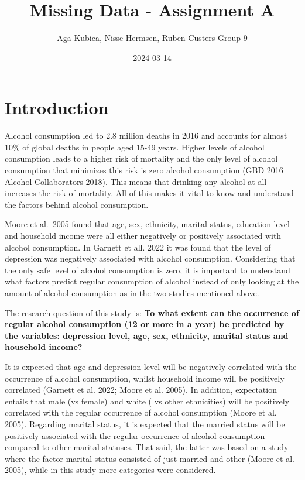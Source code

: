 \documentclass[
]{article}
\title{Missing Data - Assignment A}
\author{Aga Kubica, Nisse Hermsen, Ruben Custers \textbar{} Group 9}
\date{2024-03-14}
\begin{document}
\maketitle

{
\setcounter{tocdepth}{2}
\tableofcontents
}
\newpage

\hypertarget{introduction}{%
\section{Introduction}\label{introduction}}

Alcohol consumption led to 2.8 million deaths in 2016 and accounts for almost 10\% of global deaths in people aged 15-49 years. Higher levels of alcohol consumption leads to a higher risk of mortality and the only level of alcohol consumption that minimizes this risk is zero alcohol consumption (GBD 2016 Alcohol Collaborators 2018). This means that drinking any alcohol at all increases the risk of mortality. All of this makes it vital to know and understand the factors behind alcohol consumption.

Moore et al.~2005 found that age, sex, ethnicity, marital status, education level and household income were all either negatively or positively associated with alcohol consumption. In Garnett et all. 2022 it was found that the level of depression was negatively associated with alcohol consumption. Considering that the only safe level of alcohol consumption is zero, it is important to understand what factors predict regular consumption of alcohol instead of only looking at the amount of alcohol consumption as in the two studies mentioned above.

The research question of this study is: \textbf{To what extent can the occurrence of regular alcohol consumption (12 or more in a year) be predicted by the variables: depression level, age, sex, ethnicity, marital status and household income?}

It is expected that age and depression level will be negatively correlated with the occurrence of alcohol consumption, whilst household income will be positively correlated (Garnett et al. 2022; Moore et al. 2005). In addition, expectation entails that male (vs female) and white ( vs other ethnicities) will be positively correlated with the regular occurrence of alcohol consumption (Moore et al. 2005). Regarding marital status, it is expected that the married status will be positively associated with the regular occurrence of alcohol consumption compared to other marital statuses. That said, the latter was based on a study where the factor marital status consisted of just married and other (Moore et al. 2005), while in this study more categories were considered.
\end{document}
